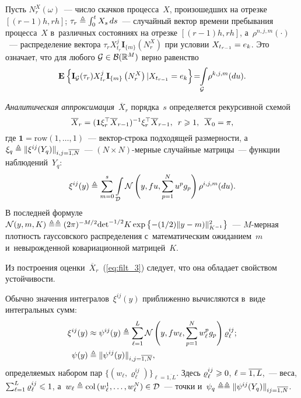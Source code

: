 \begin{multicols}{2}
    Пусть $N_r^X(\omega)$~--- число скачков процесса~$X$, произошедших 
    на отрезке $[(r-1)h,rh]$; $\tau_r \triangleq \int\nolimits_0^t X_s\,ds$~--- 
    случайный вектор времени пребывания процесса~$X$ в~различных состояниях 
    на отрезке $[(r-1)h,rh]$, а~$\rho^{n,j,m}(\cdot)$~--- 
    распределение вектора
 $\tau_{r}X_{t_{r}}^{j}\mathbf{I}_{\{m\}}(N_{r}^X)$ 
 при условии $X_{t_{r-1}}\hm=e_k$. Это означает, что
 для любого $\mathcal{G} \hm\in \mathcal{B}(\mathbb{R}^M)$ верно равенство
$$
\mathbf{E}_{  }\left\{ \mathop{\mathbf{I}_{\mathcal{G}}(\tau_r)X_{t_r}^j\mathbf{I}_{\{m\}}
\left(N_r^X\right)\vert X_{t_{r-1}}=e_k} \right\}\!
=
 \!\! \int\limits_{\mathcal{G}}\! \rho^{k,j,m}(du).
$$

\textit{Аналитическая аппроксимация}~$\overline{X}_r$ порядка~$s$ 
определяется рекурсивной схемой
 \begin{equation}
\overline{X}_r = (\mathbf{1}\xi_{r}^{\top}\overline{X}_{r-1})^{-1} 
\xi_{r}^{\top}\overline{X}_{r-1}, \enskip
r \geqslant 1, \enskip \overline{X}_0=\pi,
 \label{eq:filt_3}
 \end{equation}
 где $\mathbf{1} = \mathrm{row} (1,\ldots,1)$~--- век\-тор-стро\-ка 
 подходящей размерности,
 а $\xi_q \triangleq \|\xi^{ij}(Y_q)\|_{i,j=\overline{1,N}}$~---
  $(N \times N)$-мер\-ные случайные матрицы~--- функции наблюдений~$Y_q$:
 \begin{equation}
 \xi^{ij}(y)\triangleq
\sum\limits_{m=0}^s \int\limits_{\mathcal{D}}
 \mathcal{N}\left(y,f u,\sum\limits_{p=1}^N u^p g_p\right)
 \rho^{i,j,m}(du).
 \label{eq:xi_def}
 \end{equation}
 В последней формуле 
 $\mathcal{N}(y,m,K) \ebd\linebreak \ebd (2\pi)^{-M/2} \mathrm{det}^{-1/2} 
 K \exp\left\{ -({1}/{2})\|y-m)\|^2_{K^{-1}}\right\}$~---\linebreak
  $M$-мер\-ная 
 плотность гауссовского распределения с~математическим ожиданием~$m$ 
 и~невырожденной ковариационной матрицей~$K$.

 Из построения оценки~$\overline{X}_r$~(\ref{eq:filt_3}) следует, что 
 она обладает свойством устойчивости.

 Обычно значения интегралов~$\xi^{ij}(y)$ приближенно вычисляются в~виде 
 интегральных сумм:
  \begin{align*}
  \xi^{ij}(y) &\approx \psi^{ij}(y) \triangleq
 \sum\limits_{\ell=1}^{L} \mathcal{N}\left(y,f w_{\ell},\sum\limits_{p=1}^N 
 w^p_{\ell} g_p\right)\varrho_{\ell}^{ij}; \\
 \psi(y) &\triangleq \|\psi^{ij}(y)\|_{i,j=\overline{1,N}},
  \end{align*}
  определяемых набором пар $\{(w_{\ell},
  \varrho_{\ell}^{ij})\}_{\ell=\overline{1,L}}$. 
  Здесь $\varrho_{\ell}^{ij} \hm\geqslant 0$, $\ell\hm=\overline{1,L}$,~--- 
  веса, $\sum\nolimits_{\ell=1}^L\varrho_{\ell}^{ij}\hm \leqslant 1$, 
  а~$w_{\ell}\ebd \col(w^1_{\ell},\ldots,w^N_{\ell}) \hm\in \mathcal{D}$~--- 
  точки
  и~$\psi_q \ebd\linebreak \ebd \|\psi^{ij}(Y_q)\|_{ij=\overline{1,N}}$.


\end{multicols}
